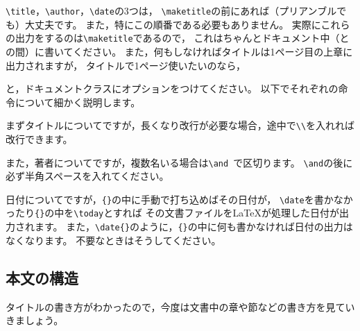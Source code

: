 \verb|\title|，\verb|\author|，\verb|\date|の3つは，
\verb|\maketitle|の前にあれば（プリアンブルでも）大丈夫です。
また，特にこの順番である必要もありません。
実際にこれらの出力をするのは\verb|\maketitle|であるので，
これはちゃんとドキュメント中（\verb||と\verb||の間）に書いてください。
また，何もしなければタイトルは1ページ目の上章に出力されますが，
タイトルで1ページ使いたいのなら，
と，ドキュメントクラスにオプションをつけてください。
以下でそれぞれの命令について細かく説明します。

まずタイトルについてですが，長くなり改行が必要な場合，途中で\verb|\\|を入れれば改行できます。

また，著者についてですが，複数名いる場合は\verb*|\and |で区切ります。
\verb|\and|の後に必ず半角スペースを入れてください。

日付についてですが，\verb|{}|の中に手動で打ち込めばその日付が，
\verb|\date|を書かなかったり\verb|{}|の中を\verb|\today|とすれば
その文書ファイルを{\LaTeX}が処理した日付が出力されます。
また，\verb|\date{}|のように，\verb|{}|の中に何も書かなければ日付の出力はなくなります。
不要なときはそうしてください。


\subsection{本文の構造}
タイトルの書き方がわかったので，今度は文書中の章や節などの書き方を見ていきましょう。

